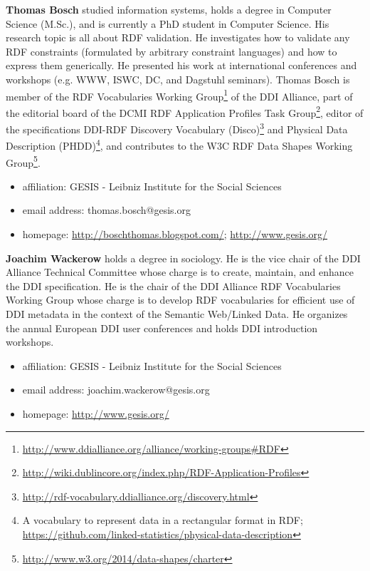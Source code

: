 \documentclass{llncs}
\begin{document}
\textbf{Thomas Bosch} studied information systems, holds a degree in Computer Science (M.Sc.), and is currently a PhD student in Computer Science.
His research topic is all about RDF validation.
He investigates how to validate any RDF constraints (formulated by arbitrary constraint languages) and how to express them generically. 
He presented his work at international conferences and workshops (e.g. WWW, ISWC, DC, and Dagstuhl seminars). 
Thomas Bosch is member of the RDF Vocabularies Working Group\footnote{\url{http://www.ddialliance.org/alliance/working-groups#RDF}} of the DDI Alliance,
part of the editorial board of the  DCMI RDF Application Profiles Task Group\footnote{\url{http://wiki.dublincore.org/index.php/RDF-Application-Profiles}}, 
editor of the specifications DDI-RDF Discovery Vocabulary (Disco)\footnote{\url{http://rdf-vocabulary.ddialliance.org/discovery.html}}
and Physical Data Description (PHDD)\footnote{A vocabulary to represent data in a rectangular format in RDF; \url{https://github.com/linked-statistics/physical-data-description}},
and contributes to the W3C RDF Data Shapes Working Group\footnote{\url{http://www.w3.org/2014/data-shapes/charter}}.

\begin{itemize}
  \item affiliation: GESIS - Leibniz Institute for the Social Sciences
  \item email address: thomas.bosch@gesis.org
	\item homepage: \url{http://boschthomas.blogspot.com/}; \url{http://www.gesis.org/}
\end{itemize}

\textbf{Joachim Wackerow} holds a degree in sociology. 
He is the vice chair of the DDI Alliance Technical Committee whose charge is to create, maintain, and enhance the DDI specification.
He is the chair of the DDI Alliance RDF Vocabularies Working Group whose charge is to develop RDF vocabularies for efficient use of DDI metadata in the context of the Semantic Web/Linked Data.
He organizes the annual European DDI user conferences and holds DDI introduction workshops.

\begin{itemize}
  \item affiliation: GESIS - Leibniz Institute for the Social Sciences
  \item email address: joachim.wackerow@gesis.org
	\item homepage: \url{http://www.gesis.org/}
\end{itemize}
\end{document}
